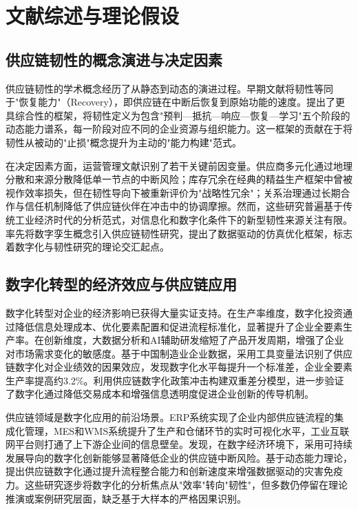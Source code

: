 \section{文献综述与理论假设}

\subsection{供应链韧性的概念演进与决定因素}

供应链韧性的学术概念经历了从静态到动态的演进过程。早期文献将韧性等同于"恢复能力"（Recovery），即供应链在中断后恢复到原始功能的速度\cite{ponomarov2009understanding}。\cite{pettit2010ensuring}提出了更具综合性的框架，将韧性定义为包含"预判—抵抗—响应—恢复—学习"五个阶段的动态能力谱系，每一阶段对应不同的企业资源与组织能力。这一框架的贡献在于将韧性从被动的"止损"概念提升为主动的"能力构建"范式。

在决定因素方面，运营管理文献识别了若干关键前因变量。供应商多元化通过地理分散和来源分散降低单一节点的中断风险；库存冗余在经典的精益生产框架中曾被视作效率损失，但在韧性导向下被重新评价为"战略性冗余"；关系治理通过长期合作与信任机制降低了供应链伙伴在冲击中的协调摩擦。然而，这些研究普遍基于传统工业经济时代的分析范式，对信息化和数字化条件下的新型韧性来源关注有限。\cite{ivanov2021digital}率先将数字孪生概念引入供应链韧性研究，提出了数据驱动的仿真优化框架，标志着数字化与韧性研究的理论交汇起点。

\subsection{数字化转型的经济效应与供应链应用}

数字化转型对企业的经济影响已获得大量实证支持。在生产率维度，数字化投资通过降低信息处理成本、优化要素配置和促进流程标准化，显著提升了企业全要素生产率。在创新维度，大数据分析和AI辅助研发缩短了产品开发周期，增强了企业对市场需求变化的敏感度。\cite{wu2025impact}基于中国制造业企业数据，采用工具变量法识别了供应链数字化对企业绩效的因果效应，发现数字化水平每提升一个标准差，企业全要素生产率提高约3.2\%。\cite{chen2025supply}利用供应链数字化政策冲击构建双重差分模型，进一步验证了数字化通过降低交易成本和增强信息透明度促进企业创新的传导机制。

供应链领域是数字化应用的前沿场景。ERP系统实现了企业内部供应链流程的集成化管理，MES和WMS系统提升了生产和仓储环节的实时可视化水平，工业互联网平台则打通了上下游企业间的信息壁垒。\cite{bai2025exploring}发现，在数字经济环境下，采用可持续发展导向的数字化创新能够显著降低企业的供应链中断风险。\cite{alyasein2026supply}基于动态能力理论，提出供应链数字化通过提升流程整合能力和创新速度来增强数据驱动的灾害免疫力。这些研究逐步将数字化的分析焦点从"效率"转向"韧性"，但多数仍停留在理论推演或案例研究层面，缺乏基于大样本的严格因果识别。


